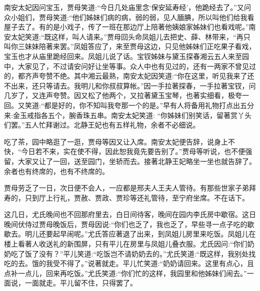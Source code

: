 \begin{parag}
    南安太妃因问宝玉，贾母笑道:“今日几处庙里念‘保安延寿经’，他跪经去了。”又问众小姐们，贾母笑道:“他们姊妹们病的病，弱的弱，见人腼腆，所以叫他们给我看屋子去了。有的是小戏子，传了一班在那边厅上陪著他姨娘家姊妹们也看戏呢。”南安太妃笑道:“既这样，叫人请来。”贾母回头命凤姐儿去把史、薛、林带来，“再只叫你三妹妹陪著来罢。”凤姐答应了，来至贾母这边，只见他姊妹们正吃果子看戏，宝玉也才从庙里跪经回来。凤姐儿说了话。宝钗姊妹与黛玉探春湘云五人来至园中，大家见了，不过请安问好让坐等事。众人中也有见过的，还有一两家不曾见过的，都齐声夸赞不绝。其中湘云最熟，南安太妃因笑道:“你在这里，听见我来了还不出来，还只等请去。我明儿和你叔叔算帐。”因一手拉著探春，一手拉著宝钗，问几岁了，又连声夸赞。因又松了他两个，又拉著黛玉宝琴，也著实细看，极夸一回。又笑道:“都是好的，你不知叫我夸那一个的是。”早有人将备用礼物打点出五分来:金玉戒指各五个，腕香珠五串。南安太妃笑道: “你姊妹们别笑话，留著赏丫头们罢。”五人忙拜谢过。北静王妃也有五样礼物，余者不必细说。
\end{parag}


\begin{parag}
    吃了茶，园中略逛了一逛，贾母等因又让入席。南安太妃便告辞，说身上不快，“今日若不来，实在使不得，因此恕我竟先要告别了。”贾母等听说，也不便强留，大家又让了一回，送至园门，坐轿而去。接著北静王妃略坐一坐也就告辞了。余者也有终席的，也有不终席的。
\end{parag}


\begin{parag}
    贾母劳乏了一日，次日便不会人，一应都是邢夫人王夫人管待。有那些世家子弟拜寿的，只到厅上行礼，贾赦、贾政、贾珍等还礼管待，至宁府坐席。不在话下。
\end{parag}


\begin{parag}
    这几日，尤氏晚间也不回那府里去，白日间待客，晚间在园内李氏房中歇宿。这日晚间伏侍过贾母晚饭后，贾母因说:“你们也乏了，我也乏了，早些寻一点子吃的歇歇去。明儿还要起早闹呢。”尤氏答应著退了出来，到凤姐儿房里来吃饭。凤姐儿在楼上看著人收送礼的新围屏，只有平儿在房里与凤姐儿叠衣服。尤氏因问:“你们奶奶吃了饭了没有？”平儿笑道:“吃饭岂不请奶奶去的。”尤氏笑道:“既这样，我别处找吃的去。饿的我受不得了。”说著就走。平儿忙笑道:“奶奶请回来。这里有点心，且点补一点儿，回来再吃饭。”尤氏笑道:“你们忙的这样，我园里和他姊妹们闹去。”一面说，一面就走。平儿留不住，只得罢了。
\end{parag}


